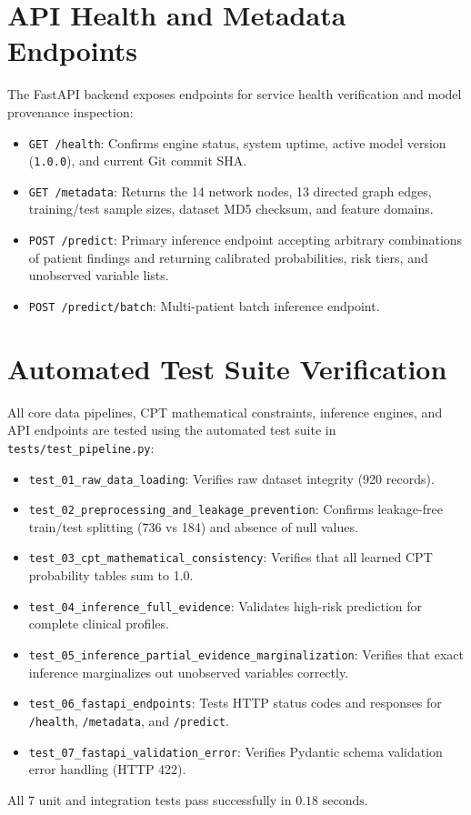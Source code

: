 \documentclass[12pt,a4paper]{report}
\begin{document}
\section{API Health and Metadata Endpoints}
The FastAPI backend exposes endpoints for service health verification and model provenance inspection:
\begin{itemize}
\item \texttt{GET /health}: Confirms engine status, system uptime, active model version (\texttt{1.0.0}), and current Git commit SHA.
\item \texttt{GET /metadata}: Returns the 14 network nodes, 13 directed graph edges, training/test sample sizes, dataset MD5 checksum, and feature domains.
\item \texttt{POST /predict}: Primary inference endpoint accepting arbitrary combinations of patient findings and returning calibrated probabilities, risk tiers, and unobserved variable lists.
\item \texttt{POST /predict/batch}: Multi-patient batch inference endpoint.
\end{itemize}

\section{Automated Test Suite Verification}
All core data pipelines, CPT mathematical constraints, inference engines, and API endpoints are tested using the automated test suite in \texttt{tests/test\_pipeline.py}:
\begin{itemize}
\item \texttt{test\_01\_raw\_data\_loading}: Verifies raw dataset integrity (920 records).
\item \texttt{test\_02\_preprocessing\_and\_leakage\_prevention}: Confirms leakage-free train/test splitting (736 vs 184) and absence of null values.
\item \texttt{test\_03\_cpt\_mathematical\_consistency}: Verifies that all learned CPT probability tables sum to 1.0.
\item \texttt{test\_04\_inference\_full\_evidence}: Validates high-risk prediction for complete clinical profiles.
\item \texttt{test\_05\_inference\_partial\_evidence\_marginalization}: Verifies that exact inference marginalizes out unobserved variables correctly.
\item \texttt{test\_06\_fastapi\_endpoints}: Tests HTTP status codes and responses for \texttt{/health}, \texttt{/metadata}, and \texttt{/predict}.
\item \texttt{test\_07\_fastapi\_validation\_error}: Verifies Pydantic schema validation error handling (HTTP 422).
\end{itemize}
All 7 unit and integration tests pass successfully in $0.18\text{ seconds}$.
\end{document}
